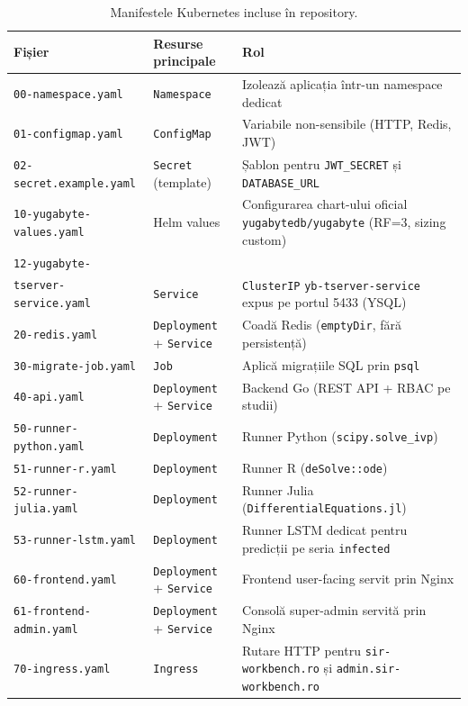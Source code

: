 \begin{table}[htbp]
\centering
\caption{Manifestele Kubernetes incluse în repository.}
\label{tab:k8s_manifeste}
\small
\renewcommand{\arraystretch}{1.2}
\begin{tabular}{p{4.6cm}p{4.2cm}p{5.5cm}}
\toprule
\textbf{Fișier} & \textbf{Resurse principale} & \textbf{Rol} \\
\midrule
\texttt{00-namespace.yaml}                  & \texttt{Namespace}                       & Izolează aplicația într-un namespace dedicat \\
\texttt{01-configmap.yaml}                  & \texttt{ConfigMap}                       & Variabile non-sensibile (HTTP, Redis, JWT) \\
\texttt{02-secret.example.yaml}             & \texttt{Secret} (template)               & Șablon pentru \texttt{JWT\_SECRET} și \texttt{DATABASE\_URL} \\
\texttt{10-yugabyte-values.yaml}            & Helm values                              & Configurarea chart-ului oficial \texttt{yugabytedb/yugabyte} (RF=3, sizing custom) \\
\texttt{12-yugabyte-}\\\texttt{tserver-service.yaml} & \texttt{Service}                         & \texttt{ClusterIP} \texttt{yb-tserver-service} expus pe portul 5433 (YSQL) \\
\texttt{20-redis.yaml}                      & \texttt{Deployment} + \texttt{Service}   & Coadă Redis (\texttt{emptyDir}, fără persistență) \\
\texttt{30-migrate-job.yaml}                & \texttt{Job}                             & Aplică migrațiile SQL prin \texttt{psql} \\
\texttt{40-api.yaml}                        & \texttt{Deployment} + \texttt{Service}   & Backend Go (REST API + RBAC pe studii) \\
\texttt{50-runner-python.yaml}              & \texttt{Deployment}                      & Runner Python (\texttt{scipy.solve\_ivp}) \\
\texttt{51-runner-r.yaml}                   & \texttt{Deployment}                      & Runner R (\texttt{deSolve::ode}) \\
\texttt{52-runner-julia.yaml}               & \texttt{Deployment}                      & Runner Julia (\texttt{DifferentialEquations.jl}) \\
\texttt{53-runner-lstm.yaml}                & \texttt{Deployment}                      & Runner LSTM dedicat pentru predicții pe seria \texttt{infected} \\
\texttt{60-frontend.yaml}                   & \texttt{Deployment} + \texttt{Service}   & Frontend user-facing servit prin Nginx \\
\texttt{61-frontend-admin.yaml}             & \texttt{Deployment} + \texttt{Service}   & Consolă super-admin servită prin Nginx \\
\texttt{70-ingress.yaml}                    & \texttt{Ingress}                         & Rutare HTTP pentru \texttt{sir-workbench.ro} și \texttt{admin.sir-workbench.ro} \\
\bottomrule
\end{tabular}
\end{table}

